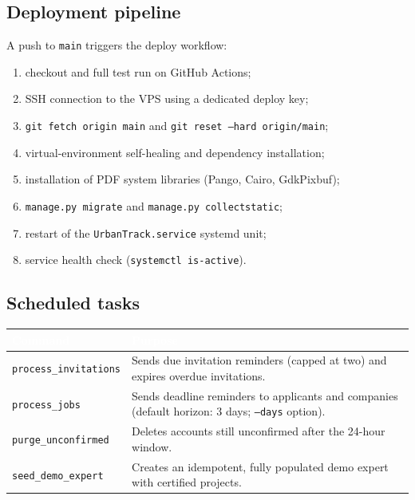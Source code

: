 \documentclass[11pt,a4paper]{article}
\renewcommand{\arraystretch}{1.25}
\newcommand{\theadcell}[1]{\textcolor{white}{\textbf{#1}}}
\newcommand{\tablehead}[1]{\rowcolor{mil900}#1}
\newcommand{\tablealt}{\rowcolor{mil50}}
\begin{document}
\subsection{Deployment pipeline}

A push to \texttt{main} triggers the deploy workflow:

\begin{enumerate}[leftmargin=1.8em,itemsep=3pt]
  \item checkout and full test run on GitHub Actions;
  \item SSH connection to the VPS using a dedicated deploy key;
  \item \texttt{git fetch origin main} and \texttt{git reset --hard origin/main};
  \item virtual-environment self-healing and dependency installation;
  \item installation of PDF system libraries (Pango, Cairo, GdkPixbuf);
  \item \texttt{manage.py migrate} and \texttt{manage.py collectstatic};
  \item restart of the \texttt{UrbanTrack.service} systemd unit;
  \item service health check (\texttt{systemctl is-active}).
\end{enumerate}

\subsection{Scheduled tasks}

\begin{center}
\renewcommand{\arraystretch}{1.3}
\begin{tabularx}{\textwidth}{@{}L{5.2cm}Y@{}}
  \toprule
  \tablehead{\theadcell{Command} & \theadcell{Purpose}} \\
  \midrule
  \texttt{process\_invitations} & Sends due invitation reminders (capped at
  two) and expires overdue invitations. \\
  \tablealt
  \texttt{process\_jobs} & Sends deadline reminders to applicants and
  companies (default horizon: 3 days; \texttt{--days} option). \\
  \texttt{purge\_unconfirmed} & Deletes accounts still unconfirmed after the
  24-hour window. \\
  \tablealt
  \texttt{seed\_demo\_expert} & Creates an idempotent, fully populated demo
  expert with certified projects. \\
  \bottomrule
\end{tabularx}
\end{center}
\end{document}
